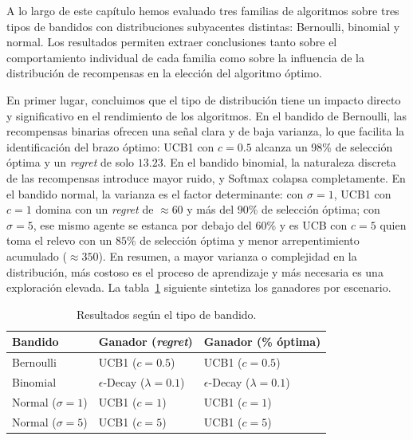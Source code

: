 A lo largo de este capítulo hemos evaluado tres familias de algoritmos sobre tres tipos de bandidos con distribuciones subyacentes distintas: Bernoulli, binomial y normal. Los resultados permiten extraer conclusiones tanto sobre el comportamiento individual de cada familia como sobre la influencia de la distribución de recompensas en la elección del algoritmo óptimo.

En primer lugar, concluimos que el tipo de distribución tiene un impacto directo y significativo en el rendimiento de los algoritmos. En el bandido de Bernoulli, las recompensas binarias ofrecen una señal clara y de baja varianza, lo que facilita la identificación del brazo óptimo: UCB1 con $c=0.5$ alcanza un 98\% de selección óptima y un \textit{regret} de solo $13.23$. En el bandido binomial, la naturaleza discreta de las recompensas introduce mayor ruido, y Softmax colapsa completamente. En el bandido normal, la varianza es el factor determinante: con $\sigma=1$, UCB1 con $c=1$ domina con un \textit{regret} de $\approx 60$ y más del $90$\% de selección óptima; con $\sigma=5$, ese mismo agente se estanca por debajo del 60\% y es UCB con $c=5$ quien toma el relevo con un $85\%$ de selección óptima y menor arrepentimiento acumulado ($\approx350$). En resumen, a mayor varianza o complejidad en la distribución, más costoso es el proceso de aprendizaje y más necesaria es una exploración elevada. La tabla~\ref{tab:res_t_bandidos} siguiente sintetiza los ganadores por escenario.

\begin{table}
\centering
\renewcommand{\arraystretch}{2} %
\setlength{\tabcolsep}{10pt}    %

\begin{scriptsize}
\begin{tabular}{l l l}
\hline
\textbf{Bandido} & \textbf{Ganador (\textit{regret})} & \textbf{Ganador (\% óptima)} \\ 
\hline
Bernoulli & UCB1 ($c = 0.5$) & UCB1 ($c = 0.5$) \\ 
\hline
Binomial & $\epsilon$-Decay ($\lambda = 0.1$) & $\epsilon$-Decay ($\lambda = 0.1$) \\ 
\hline
Normal ($\sigma = 1$) & UCB1 ($c = 1$) & UCB1 ($c = 1$) \\ 
\hline
Normal ($\sigma = 5$) & UCB1 ($c = 5$) & UCB1 ($c = 5$) \\ 
\hline
\end{tabular}
\end{scriptsize}
\caption{Resultados según el tipo de bandido.}
\label{tab:res_t_bandidos}
\end{table}

